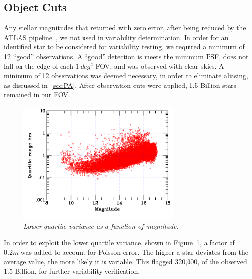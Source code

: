 \documentclass[aps,prb,twocolumn,superscriptaddress]{revtex4-1}
\begin{document}



\subsection{Object Cuts}\label{sec:cuts}

Any stellar magnitudes that returned with zero error, after being reduced by the ATLAS pipeline~\cite{gri}, we not used in variability determination.  
In order for an identified star to be considered for 
variability testing, we required a minimum of 12 ``good'' observations.  A ``good'' detection is meets the minimum 
PSF, does not fall on the edge of each $1~deg^{2}$ FOV, and was observed with clear skies.  A minimum of 12 
observations was deemed necessary, in order to eliminate aliasing, as discussed in~\cref{sec:PA}.  After observation 
cuts were applied, 1.5 Billion stars remained in our FOV.  


\begin{figure}[H]
 \centering
 	\includegraphics[width=3.2in]{figures/grpvar.png}
 \caption{\it \small{Lower quartile variance as a function of magnitude.}}
 \label{fig:quart}
\end{figure}
  In order to exploit the lower quartile variance, shown in Figure~\ref{fig:quart}, a factor of $0.2m$ was added to account for Poisson error.  
The higher a star deviates from the average value, the more likely it is variable.  This flagged 320,000, of the observed 1.5 Billion, for 
further variability verification.
\end{document}
